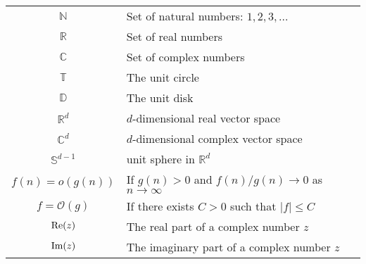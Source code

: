 \begin{tabular}{cl}
${\mathbb N}$ & Set of natural numbers: $1,2,3,\dots$\\
${\mathbb R}$ & Set of real numbers\\
${\mathbb C}$ & Set of complex numbers\\
${\mathbb T}$ & The unit circle\\
${\mathbb D}$ & The unit disk\\
${\mathbb R}^d$ & $d$-dimensional real vector space\\
${\mathbb C}^d$ & $d$-dimensional complex vector space\\
${\mathbb S}^{d-1}$ & unit sphere in $\mathbb R^d$\\
${f(n)=o(g(n))}$ & If $g(n)>0$ and $f(n)/g(n)\rightarrow 0$ as $n\rightarrow \infty$\\
${f=\mathcal O(g)}$ & If there exists $C>0$ such that $|f|\leq C$\\
${\textup{Re}(z)}$ & The real part of a complex number $z$\\
${\textup{Im}(z)}$ & The imaginary part of a complex number $z$\\
\end{tabular}
